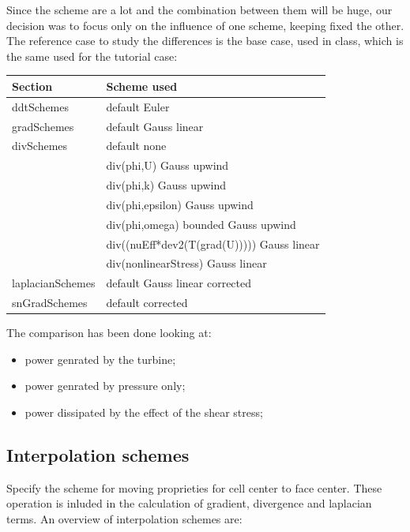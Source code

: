 \documentclass[a4paper,12pt]{article}
\newcommand{\foam}[1]{{\ttfamily #1}}
\begin{document}
Since the scheme are a lot and the combination between them will be huge, our decision was to focus only on the influence of one scheme, keeping fixed the other. The reference case to study the differences is the base case, used in class, which is the same used for the tutorial case:
\begin{table}[H]
\begin{tabular}{ll}
\toprule
Section          & \foam{Scheme used }                               \\ \midrule
ddtSchemes       & \foam{default         Euler}                      \\
gradSchemes      & \foam{default         Gauss linear}               \\
divSchemes       & \foam{default         none}                       \\
                 & \foam{div(phi,U)      Gauss upwind}               \\
                 & \foam{div(phi,k)      Gauss upwind}              \\
                 & \foam{div(phi,epsilon) Gauss upwind}              \\
                 & \foam{div(phi,omega) bounded Gauss upwind}        \\
                 & \foam{div((nuEff*dev2(T(grad(U))))) Gauss linear} \\
                 & \foam{div(nonlinearStress) Gauss linear}          \\
laplacianSchemes & \foam{default         Gauss linear corrected}     \\
snGradSchemes    & \foam{default         corrected   }              \\ \bottomrule
\end{tabular}
\end{table}

The comparison has been done looking at:
\begin{itemize} 
 \item power genrated by the turbine;
 \item power genrated by pressure only;
 \item power dissipated by the effect of the shear stress;
 \end{itemize} 

\subsection{Interpolation schemes}
Specify the scheme for moving proprieties for cell center to face center. These operation is inluded in the calculation of gradient, divergence and laplacian terms. An overview of interpolation schemes are:
\end{document}
